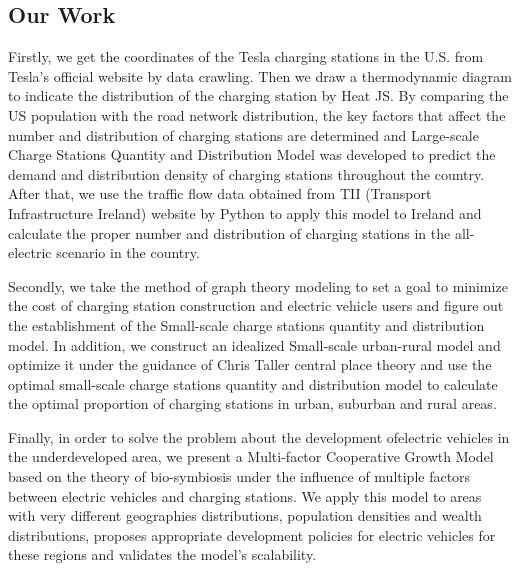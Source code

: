 \documentclass{mcmthesis}
\begin{document}
	\subsection{Our Work}
	\par
	Firstly, we get the coordinates of the Tesla charging stations in the U.S. from Tesla's official website by data crawling. Then we draw a thermodynamic diagram to indicate the distribution of the charging station by Heat JS. By comparing the US population with the road network distribution, the key factors that affect the number and distribution of charging stations are determined and Large-scale Charge Stations Quantity and Distribution Model was developed to predict the demand and distribution density of charging stations throughout the country. After that, we use the traffic flow data obtained from TII (Transport Infrastructure Ireland) website by Python to apply this model to Ireland and calculate the proper number and distribution of charging stations in the all-electric scenario in the country.
	\par
	Secondly, we take the method of graph theory modeling to set a goal to minimize the cost of charging station construction and electric vehicle users and figure out the establishment of the Small-scale charge stations quantity and distribution model. In addition, we construct an idealized Small-scale urban-rural model and optimize it under the guidance of Chris Taller central place theory and use the optimal small-scale charge stations quantity and distribution model to calculate the optimal proportion of charging stations in urban, suburban and rural areas.
	\par 
	Finally, in order to solve the problem about the development of ​​electric vehicles in the underdeveloped area, we present a Multi-factor Cooperative Growth Model based on the theory of bio-symbiosis under the influence of multiple factors between electric vehicles and charging stations. We apply this model to areas with very different geographies distributions,  population densities and wealth distributions, proposes appropriate development policies for electric vehicles for these regions and validates the model's scalability.
\end{document}
